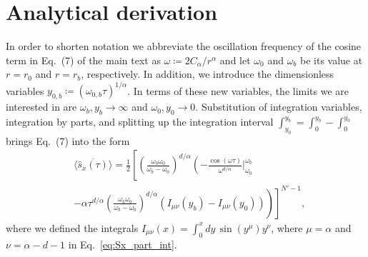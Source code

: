 \documentclass[aps,twocolumn,
superscriptaddress,
footinbib,
prl]{revtex4-1}
\begin{document}
\section{Analytical derivation}
\label{supA}
In order to shorten notation we abbreviate the oscillation frequency of the cosine term in Eq.~(7) of the main text as $\omega  \coloneqq 2 C_\alpha/r^\alpha$ and let $\omega_0$ and $\omega_b$ be its value
at $r=r_0$ and $r=r_b$, respectively. In addition, we introduce the dimensionless variables $y_{0,b} \coloneqq (\omega_{0,b} \tau)^{1/\alpha}$. In terms of these new variables, the limits we are interested in are $\omega_b,y_b\to \infty$ and $\omega_0,y_0\to 0$.
Substitution of integration variables, integration by parts, and splitting up the integration interval $\int_{y_0}^{y_b}=\int_{0}^{y_b}-\int_{0}^{y_0}$ brings Eq.~(7) into the form
\begin{equation}
\label{eq:Sx_part_int}
\begin{split}
             & \overline{\langle \hat{s}_x(\tau) \rangle} =  \frac{1}{2}\left[\left( \frac{\omega_b \omega_0}{\omega_b - \omega _0}\right) ^{d/\alpha }\left( - \frac{\cos(\omega \tau)}{\omega^{d/\alpha}}  \Big|_{\omega_0}^{\omega_b} \right.\right.  \\
            & \left.\left. - \alpha \tau ^{d/\alpha}\left( \frac{\omega_b \omega_0}{\omega_b - \omega _0}\right) ^{d/\alpha }\left(I_{\mu\nu}(y_b) - I_{\mu\nu}(y_0)\right)\right)\right]^{N'-1},
\end{split}
\end{equation}
where we defined the integrals $I_{\mu\nu}(x) =  \int_{0}^{x} dy \, \sin(y^\mu) y^{\nu}$, where $\mu = \alpha$ and $\nu = \alpha - d -1$ in Eq.~\eqref{eq:Sx_part_int}. 
\end{document}
